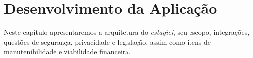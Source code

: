 \chapter{Desenvolvimento da Aplicação}
Neste capítulo apresentaremos a arquitetura do \emph{estagiei}, seu escopo, integrações, questões de segurança, privacidade e legislação, assim como itens de manutenibilidade e viabilidade financeira.






%



%



